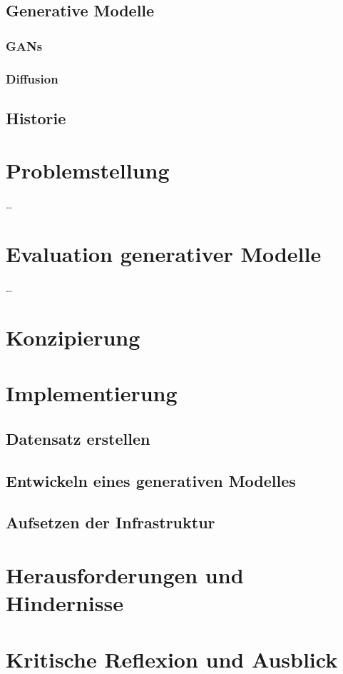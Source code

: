 \documentclass[12pt,a4paper]{article}
\begin{document}
\subsection{Generative Modelle}
\subsubsection{GANs}
\subsubsection{Diffusion}
\subsection{Historie}

\section{Problemstellung}
\dots

\section{Evaluation generativer Modelle}
\dots

\section{Konzipierung}

\section{Implementierung}

\subsection{Datensatz erstellen}

\subsection{Entwickeln eines generativen Modelles}

\subsection{Aufsetzen der Infrastruktur}

\section{Herausforderungen und Hindernisse}

\section{Kritische Reflexion und Ausblick} 


\newpage
{}
\small
\printbibliography	
\end{document}
